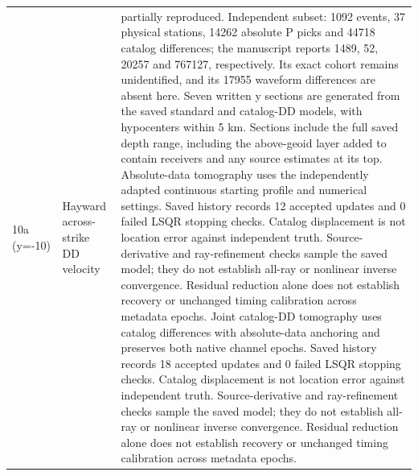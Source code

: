 \begin{longtable}{>{\raggedright\arraybackslash}p{}>{\raggedright\arraybackslash}p{}>{\raggedright\arraybackslash}p{}}
10a (y=-10) & Hayward across-strike DD velocity & partially reproduced. Independent subset: 1092 events, 37 physical stations, 14262 absolute P picks and 44718 catalog differences; the manuscript reports 1489, 52, 20257 and 767127, respectively. Its exact cohort remains unidentified, and its 17955 waveform differences are absent here. Seven written y sections are generated from the saved standard and catalog-DD models, with hypocenters within 5 km. Sections include the full saved depth range, including the above-geoid layer added to contain receivers and any source estimates at its top. Absolute-data tomography uses the independently adapted continuous starting profile and numerical settings. Saved history records 12 accepted updates and 0 failed LSQR stopping checks. Catalog displacement is not location error against independent truth. Source-derivative and ray-refinement checks sample the saved model; they do not establish all-ray or nonlinear inverse convergence. Residual reduction alone does not establish recovery or unchanged timing calibration across metadata epochs. Joint catalog-DD tomography uses catalog differences with absolute-data anchoring and preserves both native channel epochs. Saved history records 18 accepted updates and 0 failed LSQR stopping checks. Catalog displacement is not location error against independent truth. Source-derivative and ray-refinement checks sample the saved model; they do not establish all-ray or nonlinear inverse convergence. Residual reduction alone does not establish recovery or unchanged timing calibration across metadata epochs.\\

\end{longtable}
